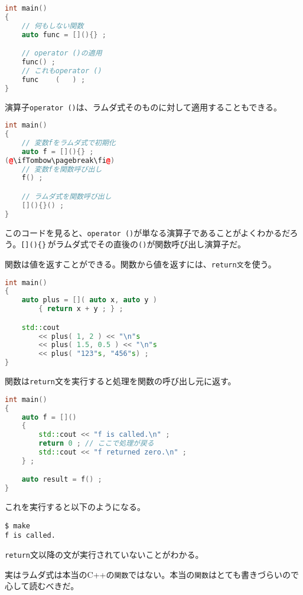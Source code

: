 \begin{lstlisting}[language={C++}]
int main()
{
    // 何もしない関数
    auto func = [](){} ;

    // operator ()の適用
    func() ;
    // これもoperator ()
    func    (   ) ;
}
\end{lstlisting}

演算子\texttt{operator ()}は、ラムダ式そのものに対して適用することもできる。

\begin{lstlisting}[language={C++}]
int main()
{
    // 変数fをラムダ式で初期化
    auto f = [](){} ;
(@\ifTombow\pagebreak\fi@)
    // 変数fを関数呼び出し
    f() ;

    // ラムダ式を関数呼び出し
    [](){}() ;
}
\end{lstlisting}

このコードを見ると、\texttt{operator ()}が単なる演算子であることがよくわかるだろう。\texttt{[]()\{\}}\,がラムダ式でその直後の\texttt{()}が関数呼び出し演算子だ。

関数は値を返すことができる。関数から値を返すには、\texttt{return文}を使う。

\begin{lstlisting}[language={C++}]
int main()
{
    auto plus = []( auto x, auto y )
        { return x + y ; } ;

    std::cout
        << plus( 1, 2 ) << "\n"s
        << plus( 1.5, 0.5 ) << "\n"s
        << plus( "123"s, "456"s) ;
}
\end{lstlisting}

関数は\texttt{return}文を実行すると処理を関数の呼び出し元に返す。

\begin{lstlisting}[language={C++}]
int main()
{
    auto f = []()
    {
        std::cout << "f is called.\n" ;
        return 0 ; // ここで処理が戻る
        std::cout << "f returned zero.\n" ;
    } ;

    auto result = f() ;
}
\end{lstlisting}

これを実行すると以下のようになる。

\begin{lstlisting}[style=terminal]
$ make
f is called.
\end{lstlisting}

\texttt{return}文以降の文が実行されていないことがわかる。


実はラムダ式は本当のC++の\texttt{関数}ではない。本当の\texttt{関数}はとても書きづらいので心して読むべきだ。

